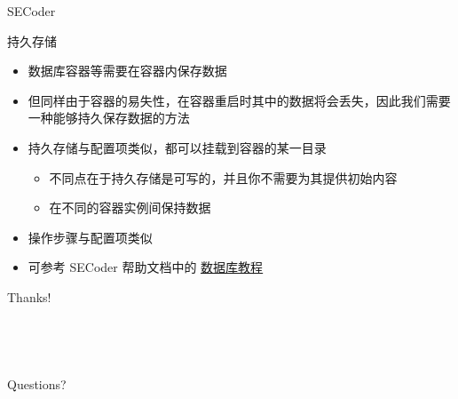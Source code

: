 \documentclass{beamer}
\begin{document}
\begin{frame}{SECoder}
    \begin{block}{持久存储}
        \begin{itemize}
            \item 数据库容器等需要在容器内保存数据
            \item 但同样由于容器的易失性，在容器重启时其中的数据将会丢失，因此我们需要一种能够持久保存数据的方法
            \item 持久存储与配置项类似，都可以挂载到容器的某一目录
            \begin{itemize}\item 不同点在于持久存储是可写的，并且你不需要为其提供初始内容
            \item 在不同的容器实例间保持数据
            \end{itemize}
            \item 操作步骤与配置项类似
            \item 可参考 SECoder 帮助文档中的  \href{https://docs.secoder.net/service/deployer/tutorial-database/}{\underline{数据库教程}}
        \end{itemize}
    \end{block}
\end{frame}

\begin{frame}
    \begin{center}
        {\Huge\calligra Thanks!} ~\\ ~\\ ~\\
        ~\\
        ~\\
        Questions?
    \end{center}
\end{frame}
\end{document}
